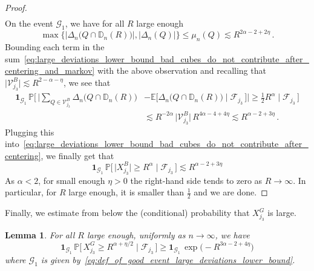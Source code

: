 \documentclass[11pt]{amsart}
\newtheorem{lemma}[theorem]{Lemma}
\theoremstyle{definition}
\theoremstyle{remark}
\numberwithin{equation}{section}
\newcommand{\bD}{\mathbb D}
\newcommand{\bP}{\mathbb P}
\newcommand{\bE}{\mathbb E}
\begin{document}
\begin{proof}
\begin{align}
		\end{align}
		On the event $\mathcal{G}_1$, we have for all $R$ large enough
		\begin{equation*}
			\max\Big\{ \big|\Delta_{n}\big(Q\cap \bD_n(R)\big)\big|,\big|\Delta_n(Q)\big|\Big\} \le \mu_n(Q) \lesssim R^{2\alpha-2+2\eta} \, .
		\end{equation*}
		Bounding each term in the sum~\eqref{eq:large_deviations_lower_bound_bad_cubes_do_not_contribute_after_centering_and_markov} with the above observation and recalling that $\big|\mathcal{V}_{j_3}^{B}\big|\lesssim R^{2-\alpha-\eta}$, we see that
		\begin{align*}
			\mathbf{1}_{\mathcal{G}_1} \, \bP\Big[ \, \Big|\sum_{Q\in \mathcal{V}_{j_3}^{B}} \Delta_{n}\big(Q\cap \bD_n(R)\big) &- \bE\big[ \Delta_{n}\big(Q\cap \bD_n(R)\big) \mid \mathcal{F}_{j_3} \, \big] \Big| \ge \tfrac{1}{2}R^{\alpha} \mid \mathcal{F}_{j_3} \, \Big] \\ &\lesssim R^{-2\alpha}\, \big|\mathcal{V}_{j_3}^{B}\big| \,  R^{4\alpha-4+4\eta} \lesssim R^{\alpha-2+3\eta}\, .
		\end{align*}
		Plugging this into~\eqref{eq:large_deviations_lower_bound_bad_cubes_do_not_contribute_after_centering}, we finally get that
		\[
		\mathbf{1}_{\mathcal{G}_1} \, \bP\Big[ \, \big|X_{j_3}^B\big| \ge R^{\alpha} \mid \mathcal{F}_{j_3} \, \Big] \lesssim R^{\alpha-2+3\eta}
		\]
		As $\alpha<2$, for small enough $\eta>0$ the right-hand side tends to zero as $R\to \infty$. In particular, for $R$ large enough, it is smaller than $\frac{1}{2}$ and we are done.
	\end{proof}
	Finally, we estimate from below the (conditional) probability that $X_{j_3}^G$ is large. 
	\begin{lemma}
		\label{lemma:large_deviations_lower_bound_good_cubes_give_correct_probability_for_disc}
		For all $R$ large enough, uniformly as $n\to \infty$, we have
		\[
		\mathbf{1}_{\mathcal{G}_1} \, \bP\Big[ \, X_{j_3}^G \ge R^{\alpha+\eta/2} \mid \mathcal{F}_{j_3} \, \Big] \ge \mathbf{1}_{\mathcal{G}_1} \, \exp\Big(-R^{3\alpha-2+4\eta}\Big)
		\]
		where $\mathcal{G}_1$ is given by~\eqref{eq:def_of_good_event_large_deviations_lower_bound}.
	\end{lemma} 
\end{document}
